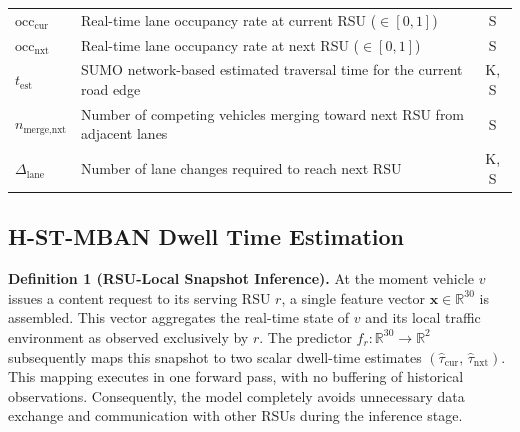 \documentclass[journal]{IEEEtran}
\begin{document}
\begin{table}[!t]
\begin{tabular}{@{}lp{5.0cm}c@{}}
    $\text{occ}_{\text{cur}}$ & Real-time lane occupancy rate at current RSU ($\in [0,1]$)                   & S \\
    $\text{occ}_{\text{nxt}}$ & Real-time lane occupancy rate at next RSU ($\in [0,1]$)                      & S \\
    $t_{\text{est}}$          & SUMO network-based estimated traversal time for the current road edge        & K, S \\
    $n_{\text{merge,nxt}}$    & Number of competing vehicles merging toward next RSU from adjacent lanes     & S \\
    $\Delta_{\text{lane}}$    & Number of lane changes required to reach next RSU                            & K, S \\
    \bottomrule
  \end{tabular}
\end{table}

\subsection{H-ST-MBAN Dwell Time Estimation}
\label{sec.prop.A}

\textbf{Definition 1 (RSU-Local Snapshot Inference).}
At the moment vehicle $v$ issues a content request to its serving RSU $r$, a single feature vector $\mathbf{x} \in \mathbb{R}^{30}$ is assembled.
This vector aggregates the real-time state of $v$ and its local traffic environment as observed exclusively by $r$.
The predictor $f_r : \mathbb{R}^{30} \to \mathbb{R}^2$ subsequently maps this snapshot to two scalar dwell-time estimates $(\hat{\tau}_\text{cur},\, \hat{\tau}_\text{nxt})$.
This mapping executes in one forward pass, with no buffering of historical observations.
Consequently, the model completely avoids unnecessary data exchange and communication with other RSUs during the inference stage.
\end{document}
